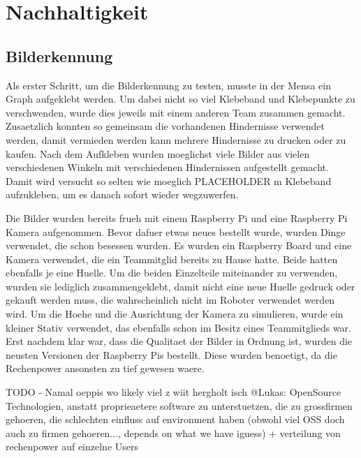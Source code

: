 \section{Nachhaltigkeit}







\subsection{Bilderkennung}

Als erster Schritt, um die Bilderkennung zu testen, musste in der Mensa ein Graph aufgeklebt werden.
Um dabei nicht so viel Klebeband und Klebepunkte zu verschwenden, wurde dies jeweils mit einem anderen Team zusammen gemacht. Zusaetzlich konnten so gemeinsam die vorhandenen Hindernisse verwendet werden, damit vermieden werden kann mehrere Hindernisse zu drucken oder zu kaufen.
Nach dem Aufkleben wurden moeglichst viele Bilder aus vielen verschiedenen Winkeln mit verschiedenen Hindernissen aufgestellt gemacht. Damit wird versucht so selten wie moeglich PLACEHOLDER m Klebeband aufzukleben, um es danach sofort wieder wegzuwerfen.

Die Bilder wurden bereits frueh mit einem Raspberry Pi und eine Raspberry Pi Kamera aufgenommen. Bevor dafuer etwas neues bestellt wurde, wurden Dinge verwendet, die schon besessen wurden. Es wurden ein Raspberry Board und eine Kamera verwendet, die ein Teammitglid bereits zu Hause hatte. Beide hatten ebenfalls je eine Huelle.
Um die beiden Einzelteile miteinander zu verwenden, wurden sie lediglich zusammengeklebt, damit nicht eine neue Huelle gedruck oder gekauft werden muss, die wahrscheinlich nicht im Roboter verwendet werden wird.
Um die Hoehe und die Ausrichtung der Kamera zu simulieren, wurde ein kleiner Stativ verwendet, das ebenfalls schon im Besitz eines Teammitglieds war.
Erst nachdem klar war, dass die Qualitaet der Bilder in Ordnung ist, wurden die neusten Versionen der Raspberry Pis bestellt. Diese wurden benoetigt, da die Rechenpower ansonsten zu tief gewesen waere.


TODO - Namal oeppis wo likely viel z wiit hergholt isch @Lukas: OpenSource Technologien, anstatt proprieaetere software zu unterstuetzen, die zu grossfirmen gehoeren, die schlechten einfluss auf environment haben (obwohl viel OSS doch auch zu firmen gehoeren..., depends on what we have iguess)  + verteilung von rechenpower auf einzelne Users 

